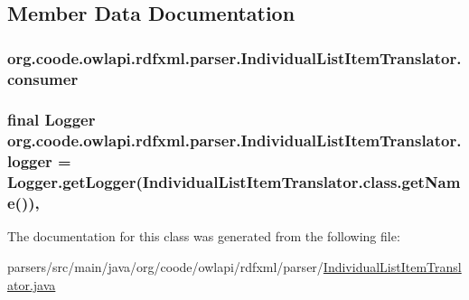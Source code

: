 \subsection{Member Data Documentation}
\hypertarget{classorg_1_1coode_1_1owlapi_1_1rdfxml_1_1parser_1_1_individual_list_item_translator_acf6dac9a268d5106743e43ea36cbccaf}{
\subsubsection[{consumer}]{ org.\-coode.\-owlapi.\-rdfxml.\-parser.\-Individual\-List\-Item\-Translator.\-consumer\hspace{0.3cm}{\ttfamily [private]}}}\label{classorg_1_1coode_1_1owlapi_1_1rdfxml_1_1parser_1_1_individual_list_item_translator_acf6dac9a268d5106743e43ea36cbccaf}
\hypertarget{classorg_1_1coode_1_1owlapi_1_1rdfxml_1_1parser_1_1_individual_list_item_translator_ab1a2a3a172b4855b1bde3b6f92164aaf}{
\subsubsection[{logger}]{\setlength{\rightskip}{0pt plus 5cm}final Logger org.\-coode.\-owlapi.\-rdfxml.\-parser.\-Individual\-List\-Item\-Translator.\-logger = Logger.\-get\-Logger(Individual\-List\-Item\-Translator.\-class.\-get\-Name())\hspace{0.3cm}{\ttfamily [static]}, {\ttfamily [private]}}}\label{classorg_1_1coode_1_1owlapi_1_1rdfxml_1_1parser_1_1_individual_list_item_translator_ab1a2a3a172b4855b1bde3b6f92164aaf}


The documentation for this class was generated from the following file\-:\begin{DoxyCompactItemize}
\item 
parsers/src/main/java/org/coode/owlapi/rdfxml/parser/\hyperlink{_individual_list_item_translator_8java}{Individual\-List\-Item\-Translator.\-java}\end{DoxyCompactItemize}
